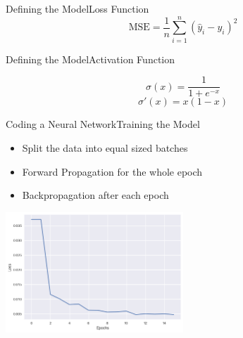 \documentclass{beamer}
\begin{document}
\begin{frame}{Defining the Model}{Loss Function}
    \begin{equation}
        \text{MSE} = \frac{1}{n}\sum_{i=1}^{n}(\hat{y}_i-y_i)^2
    \end{equation}
\end{frame}

\begin{frame}{Defining the Model}{Activation Function}
    \begin{multicols}{2}
        \begin{equation}
            \sigma(x) = \frac{1}{1+e^{-x}}
        \end{equation}
        \begin{equation}{2}
            \sigma'(x) = x(1-x)
        \end{equation}
    \end{multicols}
\end{frame}

\begin{frame}{Coding a Neural Network}{Training the Model}
\begin{multicols}{2} 
    \begin{itemize}
        \item Split the data into equal sized batches
        \item Forward Propagation for the whole epoch
        \item Backpropagation after each epoch
    \end{itemize}
    \begin{center}
        \includegraphics[width=0.5\textwidth]{images/loss}
    \end{center}
\end{multicols}
\end{frame}
\end{document}
